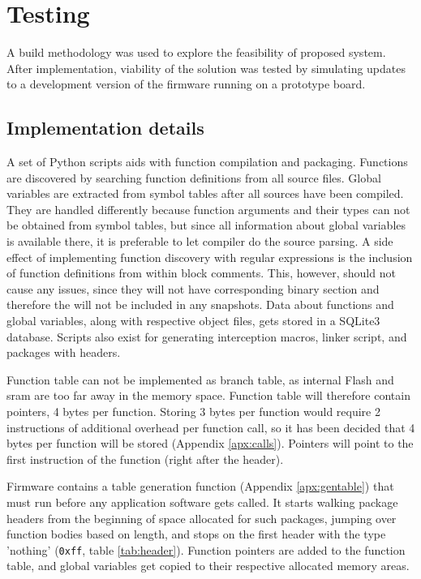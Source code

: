 \newpage
\section{Testing}

A build methodology was used to explore the feasibility of proposed system. After implementation, viability of the solution was tested by simulating updates to a development version of the firmware running on a prototype board.

\subsection{Implementation details}

A set of Python scripts aids with function compilation and packaging. Functions are discovered by searching function definitions from all source files. Global variables are extracted from symbol tables after all sources have been compiled. They are handled differently because function arguments and their types can not be obtained from symbol tables, but since all information about global variables is available there, it is preferable to let compiler do the source parsing. A side effect of implementing function discovery with regular expressions is the inclusion of function definitions from within block comments. This, however, should not cause any issues, since they will not have corresponding binary section and therefore the will not be included in any snapshots. Data about functions and global variables, along with respective object files, gets stored in a SQLite3 database. Scripts also exist for generating interception macros, linker script, and packages with headers.

Function table can not be implemented as branch table, as internal Flash and \gls{sram} are too far away in the memory space. Function table will therefore contain pointers, 4 bytes per function. Storing 3 bytes per function would require 2 instructions of additional overhead per function call, so it has been decided that 4 bytes per function will be stored (Appendix \ref{apx:calls}). Pointers will point to the first instruction of the function (right after the header).

Firmware contains a table generation function (Appendix \ref{apx:gentable}) that must run before any application software gets called. It starts walking package headers from the beginning of space allocated for such packages, jumping over function bodies based on length, and stops on the first header with the type 'nothing' (\texttt{0xff}, table \ref{tab:header}). Function pointers are added to the function table, and global variables get copied to their respective allocated memory areas.


